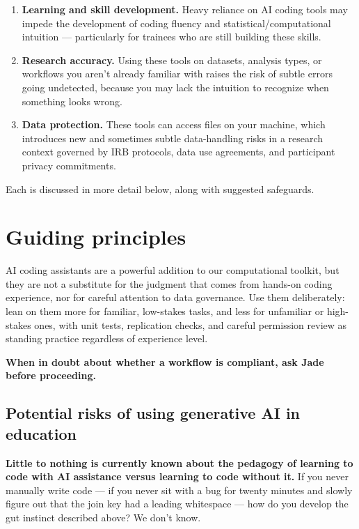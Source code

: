 \documentclass[
]{book}
\providecommand{\tightlist}{%
  \setlength{\itemsep}{0pt}\setlength{\parskip}{0pt}}
\begin{document}
\begin{enumerate}
\def\labelenumi{\arabic{enumi}.}
\tightlist
\item
  \textbf{Learning and skill development.} Heavy reliance on AI coding
  tools may impede the development of coding fluency and
  statistical/computational intuition --- particularly for trainees who
  are still building these skills.
\item
  \textbf{Research accuracy.} Using these tools on datasets, analysis
  types, or workflows you aren't already familiar with raises the risk
  of subtle errors going undetected, because you may lack the
  intuition to recognize when something looks wrong.
\item
  \textbf{Data protection.} These tools can access files on your machine,
  which introduces new and sometimes subtle data-handling risks in a
  research context governed by IRB protocols, data use agreements, and
  participant privacy commitments.
\end{enumerate}

Each is discussed in more detail below, along with suggested safeguards.

\section{Guiding principles}\label{guiding-principles}

AI coding assistants are a powerful addition to our computational
toolkit, but they are not a substitute for the judgment that comes from
hands-on coding experience, nor for careful attention to data
governance. Use them deliberately: lean on them more for familiar,
low-stakes tasks, and less for unfamiliar or high-stakes ones, with unit
tests, replication checks, and careful permission review as standing
practice regardless of experience level.

\textbf{When in doubt about whether a workflow is compliant, ask Jade before
proceeding.}

\subsection{Potential risks of using generative AI in education}\label{potential-risks-of-using-generative-ai-in-education}

\textbf{Little to nothing is currently known about the pedagogy of learning to
code with AI assistance versus learning to code without it.} If you
never manually write code --- if you never sit with a bug for twenty
minutes and slowly figure out that the join key had a leading whitespace
--- how do you develop the gut instinct described above? We don't know.
\end{document}
